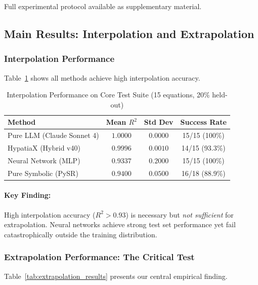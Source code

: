 Full experimental protocol available as supplementary material.


\subsection{Main Results: Interpolation and Extrapolation}

\subsubsection{Interpolation Performance}

Table~\ref{tab:interpolation_results} shows all methods achieve high interpolation accuracy.

\begin{table}[htbp]
\centering
\caption{Interpolation Performance on Core Test Suite (15 equations, 20\% held-out)}
\label{tab:interpolation_results}
\begin{tabular}{lccc}
\toprule
\textbf{Method} & \textbf{Mean $R^2$} & \textbf{Std Dev} & \textbf{Success Rate} \\
\midrule
Pure LLM (Claude Sonnet 4) & $1.0000$ & $0.0000$ & 15/15 (100\%) \\
HypatiaX (Hybrid v40) & $0.9996$ & $0.0010$ & 14/15 (93.3\%) \\
Neural Network (MLP) & $0.9337$ & $0.2000$ & 15/15 (100\%) \\
Pure Symbolic (PySR) & $0.9400$ & $0.0500$ & 16/18 (88.9\%) \\
\bottomrule
\end{tabular}
\end{table}

\paragraph{Key Finding:} High interpolation accuracy ($R^2 > 0.93$) is necessary but \emph{not sufficient} for extrapolation. Neural networks achieve strong test set performance yet fail catastrophically outside the training distribution.

\subsubsection{Extrapolation Performance: The Critical Test}

Table~\ref{tab:extrapolation_results} presents our central empirical finding.

